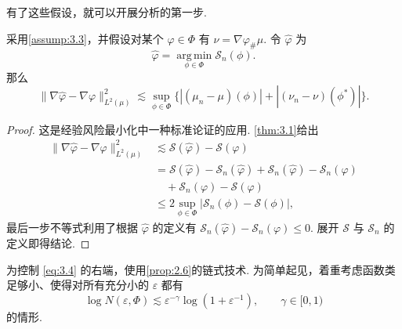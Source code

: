 有了这些假设，就可以开展分析的第一步.
\begin{lemma}\label{lem:3.4}
采用\autoref{assump:3.3}，并假设对某个 $\varphi\in\Phi$ 有 $\nu=\nabla\varphi_\#\mu$. 令 $\widehat\varphi$ 为
$$\widehat\varphi=\operatorname*{arg\,min}_{\phi\in\Phi}\mathcal S_n(\phi).$$
那么
\begin{equation}\label{eq:3.4}
\|\nabla\widehat\varphi-\nabla\varphi\|_{L^2(\mu)}^2
\lesssim\sup_{\phi\in\Phi}\{|(\mu_n-\mu)(\phi)|+|(\nu_n-\nu)(\phi^*)|\}.
\end{equation}
\end{lemma}
\begin{proof}
这是经验风险最小化中一种标准论证的应用. \autoref{thm:3.1}给出
$$\begin{aligned}
\|\nabla\widehat\varphi-\nabla\varphi\|_{L^2(\mu)}^2
&\lesssim\mathcal S(\widehat\varphi)-\mathcal S(\varphi)\\
&=\mathcal S(\widehat\varphi)-\mathcal S_n(\widehat\varphi)
+\mathcal S_n(\widehat\varphi)-\mathcal S_n(\varphi)\\
&\quad+\mathcal S_n(\varphi)-\mathcal S(\varphi)\\
&\le2\sup_{\phi\in\Phi}|\mathcal S_n(\phi)-\mathcal S(\phi)|,
\end{aligned}$$
最后一步不等式利用了根据 $\widehat\varphi$ 的定义有 $\mathcal S_n(\widehat\varphi)-\mathcal S_n(\varphi)\le0$. 展开 $\mathcal S$ 与 $\mathcal S_n$ 的定义即得结论.
\end{proof}

为控制 \eqref{eq:3.4} 的右端，使用\autoref{prop:2.6}的链式技术. 为简单起见，着重考虑函数类足够小、使得对所有充分小的 $\varepsilon$ 都有
\begin{equation}\label{eq:3.5}
\log N(\varepsilon,\Phi)\lesssim\varepsilon^{-\gamma}\log(1+\varepsilon^{-1}),\qquad\gamma\in[0,1)
\end{equation}
的情形.

